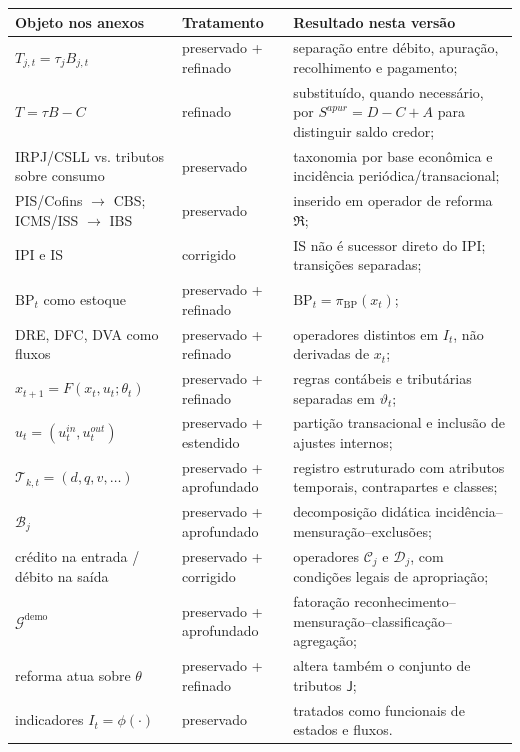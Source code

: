 \documentclass[11pt,a4paper]{article}
\newcommand{\BP}{\mathrm{BP}}
\newcommand{\cT}{\mathcal{T}}
\newcommand{\cB}{\mathcal{B}}
\newcommand{\cG}{\mathcal{G}}
\newcommand{\cC}{\mathcal{C}}
\newcommand{\cD}{\mathcal{D}}
\begin{document}
\begin{longtable}{p{} p{} p{}}
\toprule
\textbf{Objeto nos anexos} & \textbf{Tratamento} & \textbf{Resultado nesta versão}\\
\midrule
$T_{j,t}=\tau_jB_{j,t}$ & preservado + refinado & separação entre débito, apuração, recolhimento e pagamento;\\
$T=\tau B-C$ & refinado & substituído, quando necessário, por $S^{apur}=D-C+A$ para distinguir saldo credor;\\
IRPJ/CSLL vs. tributos sobre consumo & preservado & taxonomia por base econômica e incidência periódica/transacional;\\
PIS/Cofins $\to$ CBS; ICMS/ISS $\to$ IBS & preservado & inserido em operador de reforma $\mathfrak R$;\\
IPI e IS & corrigido & IS não é sucessor direto do IPI; transições separadas;\\
$\BP_t$ como estoque & preservado + refinado & $\BP_t=\pi_{\BP}(x_t)$;\\
DRE, DFC, DVA como fluxos & preservado + refinado & operadores distintos em $I_t$, não derivadas de $x_t$;\\
$x_{t+1}=F(x_t,u_t;\theta_t)$ & preservado + refinado & regras contábeis e tributárias separadas em $\vartheta_t$;\\
$u_t=(u_t^{in},u_t^{out})$ & preservado + estendido & partição transacional e inclusão de ajustes internos;\\
$\cT_{k,t}=(d,q,v,\ldots)$ & preservado + aprofundado & registro estruturado com atributos temporais, contrapartes e classes;\\
$\cB_j$ & preservado + aprofundado & decomposição didática incidência--mensuração--exclusões;\\
crédito na entrada / débito na saída & preservado + corrigido & operadores $\cC_j$ e $\cD_j$, com condições legais de apropriação;\\
$\cG^{\mathrm{demo}}$ & preservado + aprofundado & fatoração reconhecimento--mensuração--classificação--agregação;\\
reforma atua sobre $\theta$ & preservado + refinado & altera também o conjunto de tributos $\mathsf J$;\\
indicadores $I_t=\phi(\cdot)$ & preservado & tratados como funcionais de estados e fluxos.\\
\bottomrule
\end{longtable}

\end{document}
